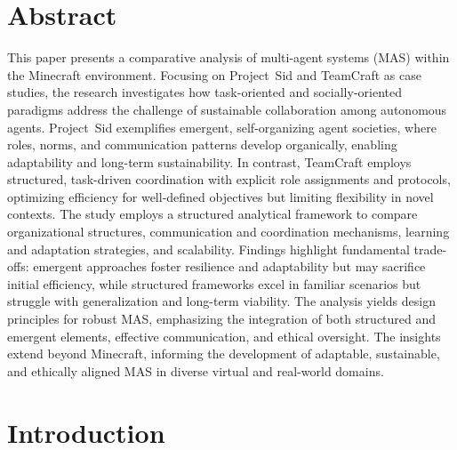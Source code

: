 \documentclass[a4paper, 12pt]{article}
\begin{document}
\section*{Abstract}
This paper presents a comparative analysis of multi-agent systems (MAS) \linebreak within the Minecraft environment. Focusing on Project~Sid and TeamCraft as case studies, the research investigates how task-oriented and socially-oriented paradigms address the challenge of sustainable collaboration among autonomous agents. \linebreak Project~Sid exemplifies emergent, self-organizing agent societies, where roles, norms, and communication patterns develop organically, enabling adaptability and long-term sustainability. In contrast, TeamCraft employs structured, task-driven coordination with explicit role assignments and protocols, optimizing efficiency for well-defined objectives but limiting flexibility in novel contexts. The study employs a structured analytical framework to compare organizational structures, communication and coordination mechanisms, learning and adaptation strategies, and scalability. Findings highlight fundamental trade-offs: emergent approaches foster resilience and adaptability but may sacrifice initial efficiency, while structured frameworks excel in familiar scenarios but struggle with generalization and long-term viability. The analysis yields design principles for robust MAS, emphasizing the integration of both structured and emergent elements, effective communication, and ethical oversight. The insights extend beyond Minecraft, informing the development of adaptable, sustainable, and ethically aligned MAS in diverse virtual and real-world domains.

\vspace*{\fill}
\clearpage

\tableofcontents
\clearpage
\listoffigures
\clearpage
\listoftables
\clearpage




\section{Introduction}
\end{document}
